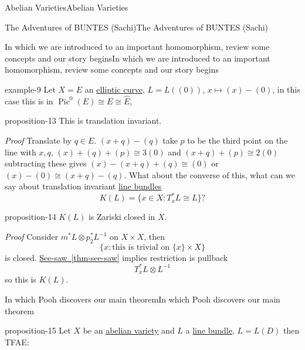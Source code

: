 \documentclass[10pt,]{book}
\makeatletter
\renewcommand*{\proofname}{Proof}
\renewenvironment{proof}[1][\proofname]{\par
  \pushQED{\qed}%
  \normalfont \topsep6\p@\@plus6\p@\relax
  \trivlist
  \item\relax
    {\itshape
    #1\@addpunct{.}}\hspace\labelsep\ignorespaces
}{%
  \popQED\endtrivlist\@endpefalse
}
\numberwithin{equation}{section}
\DeclareMathOperator{\Pic}{Pic}
\makeatother
\begin{document}
\begin{chapterptx}{Abelian Varieties}{}{Abelian Varieties}{}{}
\begin{sectionptx}{The Adventures of BUNTES (Sachi)}{}{The Adventures of BUNTES (Sachi)}{}{}
\begin{subsectionptx}{In which we are introduced to an important homomorphism, review some concepts and our story begins}{}{In which we are introduced to an important homomorphism, review some concepts and our story begins}{}{}
\begin{example}{}{example-9}%
\hypertarget{p-135}{}%
Let \(X =E\) an \hyperref[def-supersing-isog-ec]{elliptic curve}, \(L = L((0))\), \(x\mapsto (x) - (0)\), in this case this is in \(\Pic^0(E) \cong E \cong \widehat E\),%
\end{example}
\begin{proposition}{}{}{proposition-13}%
\hypertarget{p-136}{}%
This is translation invariant.%
\end{proposition}
\begin{proof}\hypertarget{proof-23}{}
\hypertarget{p-137}{}%
Translate by \(q\in E\). \((x+q) - (q)\) take \(p\) to be the third point on the line with \(x,q\), \((x) + (q) + (p) \cong 3(0)\) and \((x+q) + (p) \cong 2 (0)\) subtracting these gives \((x) - (x+q) +(q) \cong (0)\) or \((x) - (0) \cong (x+q) -(q)\).%
\end{proof}
\hypertarget{p-138}{}%
What about the converse of this, what can we say about translation invariant \hyperref[def-line-bundle]{line bundles}%
\begin{equation*}
K(L) = \{x\in X : T_x^* L \cong L\}\text{?}
\end{equation*}
%
\begin{proposition}{}{}{proposition-14}%
\hypertarget{p-139}{}%
\(K(L)\) is Zariski closed in \(X\).%
\end{proposition}
\begin{proof}\hypertarget{proof-24}{}
\hypertarget{p-140}{}%
Consider \(m^* L \otimes p_2^*L^{-1}\) on \(X\times X\), then%
\begin{equation*}
\{x : \text{this is trivial on }\{x\}\times X\}
\end{equation*}
is closed. \hyperref[thm-see-saw]{See-saw~\ref{thm-see-saw}} implies restriction is pullback%
\begin{equation*}
T_x^*L \otimes L^{-1}
\end{equation*}
so this is \(K(L)\).%
\end{proof}
\end{subsectionptx}
%
%
\typeout{************************************************}
\typeout{************************************************}
%
\begin{subsectionptx}{In which Pooh discovers our main theorem}{}{In which Pooh discovers our main theorem}{}{}\label{subsection-14}
\begin{proposition}{}{}{proposition-15}%
\hypertarget{p-141}{}%
Let \(X\) be an \hyperref[def-buntes-abvar]{abelian variety} and \(L\) a \hyperref[def-line-bundle]{line bundle}, \(L = L(D)\) then TFAE:\leavevmode%

\end{proposition}
\end{subsectionptx}
\end{sectionptx}
\end{chapterptx}
\end{document}
